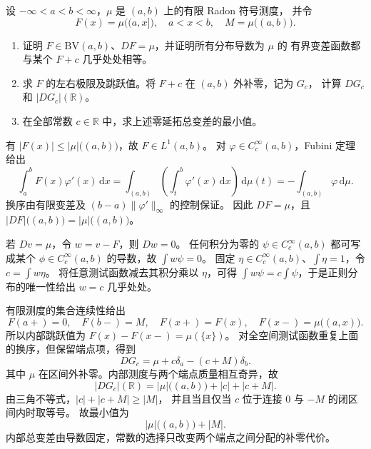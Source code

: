 \begin{exercise}\label{b1:ex:27-signed-measure-primitive}
设 \(-\infty<a<b<\infty\)，\(\mu\) 是 \((a,b)\) 上的有限 Radon 符号测度，
并令
\[
 F(x)=\mu\bigl((a,x]\bigr),\quad a<x<b,\quad M=\mu\bigl((a,b)\bigr).
\]
\begin{enumerate}
 \item\label{b1:item:27-measure-primitive}
 证明 \(F\in \mathrm{BV}(a,b)\)、\(DF=\mu\)，并证明所有分布导数为 \(\mu\) 的
 有界变差函数都与某个 \(F+c\) 几乎处处相等。
 \item\label{b1:item:27-measure-primitive-endpoints}
 求 \(F\) 的左右极限及跳跃值。将 \(F+c\) 在 \((a,b)\) 外补零，记为 \(G_c\)，
 计算 \(DG_c\) 和 \(|DG_c|(\mathbb R)\)。
 \item\label{b1:item:27-measure-primitive-optimal-constant}
 在全部常数 \(c\in\mathbb R\) 中，求上述零延拓总变差的最小值。
\end{enumerate}
\end{exercise}
\begin{solution}
有 \(|F(x)|\le|\mu|\bigl((a,b)\bigr)\)，故 \(F\in L^1(a,b)\)。
对 \(\varphi\in C_c^\infty(a,b)\)，Fubini 定理给出
\[
 \int_a^bF(x)\varphi'(x)\,\mathrm dx
 =\int_{(a,b)}\left(\int_t^b\varphi'(x)\,\mathrm dx\right)\,\mathrm d\mu(t)
 =-\int_{(a,b)}\varphi\,\mathrm d\mu.
\]
换序由有限变差及 \((b-a)\|\varphi'\|_\infty\) 的控制保证。
因此 \(DF=\mu\)，且 \(|DF|\bigl((a,b)\bigr)=|\mu|\bigl((a,b)\bigr)\)。

若 \(Dv=\mu\)，令 \(w=v-F\)，则 \(Dw=0\)。
任何积分为零的 \(\psi\in C_c^\infty(a,b)\) 都可写成某个
\(\phi\in C_c^\infty(a,b)\) 的导数，故 \(\int w\psi=0\)。
固定 \(\eta\in C_c^\infty(a,b)\)、\(\int\eta=1\)，令 \(c=\int w\eta\)。
将任意测试函数减去其积分乘以 \(\eta\)，可得
\(\int w\psi=c\int\psi\)，于是正则分布的唯一性给出 \(w=c\) 几乎处处。

有限测度的集合连续性给出
\[
 F(a+)=0,\quad F(b-)=M,\quad
 F(x+)=F(x),\quad F(x-)=\mu\bigl((a,x)\bigr).
\]
所以内部跳跃值为 \(F(x)-F(x-)=\mu(\{x\})\)。
对全空间测试函数重复上面的换序，但保留端点项，得到
\[
 DG_c=\mu+c\delta_a-(c+M)\delta_b.
\]
其中 \(\mu\) 在区间外补零。内部测度与两个端点质量相互奇异，故
\[
 |DG_c|(\mathbb R)=|\mu|\bigl((a,b)\bigr)+|c|+|c+M|.
\]
由三角不等式，\(|c|+|c+M|\ge|M|\)，
并且当且仅当 \(c\) 位于连接 \(0\) 与 \(-M\) 的闭区间内时取等号。
故最小值为
\[
 |\mu|\bigl((a,b)\bigr)+|M|.
\]
内部总变差由导数固定，常数的选择只改变两个端点之间分配的补零代价。
\end{solution}

